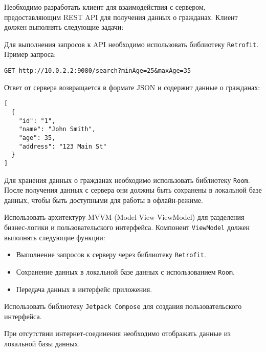 
Необходимо разработать клиент для взаимодействия с сервером, предоставляющим REST API для получения данных о гражданах. Клиент должен выполнять следующие задачи:


Для выполнения запросов к API необходимо использовать библиотеку \texttt{Retrofit}. Пример запроса:

\begin{verbatim}
GET http://10.0.2.2:9080/search?minAge=25&maxAge=35
\end{verbatim}

Ответ от сервера возвращается в формате JSON и содержит данные о гражданах:

\begin{verbatim}
[
  {
    "id": "1",
    "name": "John Smith",
    "age": 35,
    "address": "123 Main St"
  }
]
\end{verbatim}

Для хранения данных о гражданах необходимо использовать библиотеку \texttt{Room}. После получения данных с сервера они должны быть сохранены в локальной базе данных, чтобы быть доступными для работы в офлайн-режиме.

Использовать архитектуру MVVM (Model-View-ViewModel) для разделения бизнес-логики и пользовательского интерфейса. Компонент \texttt{ViewModel} должен выполнять следующие функции:
\begin{itemize}
    \item Выполнение запросов к серверу через библиотеку \texttt{Retrofit}.
    \item Сохранение данных в локальной базе данных с использованием \texttt{Room}.
    \item Передача данных в интерфейс приложения.
\end{itemize}

Использовать библиотеку \texttt{Jetpack Compose} для создания пользовательского интерфейса.

При отсутствии интернет-соединения необходимо отображать данные из локальной базы данных.
